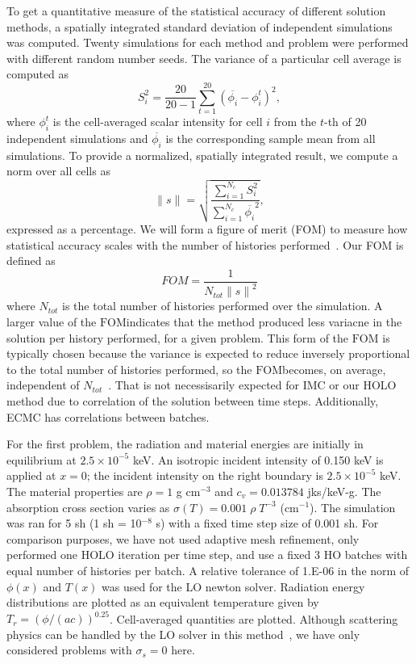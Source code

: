 \documentclass{mc2013}
\renewcommand{\ss}{\ensuremath{\|s\|}}
\newcommand{\FOM}{\ensuremath{\text{FOM}}}
\begin{document}
To get a quantitative measure of the statistical accuracy of different solution
methods, a spatially integrated standard deviation of independent simulations was
computed. Twenty simulations for each method and problem were performed with different
random number seeds.  The variance of a particular cell average is
computed as 
\begin{equation} 
    S_i^2 =  \frac{20}{20-1} \sum_{t=1}^{20} \left(\overline{\phi_{i}} -
    \phi_{i}^t\right)^2,
\end{equation}
where $\phi_{i}^t$ is the cell-averaged scalar intensity for cell $i$ from the $t$-th of 20 independent simulations and
$\overline{\phi_{i}}$ is the corresponding sample mean from all simulations. To
provide a normalized, spatially integrated result, we compute a norm over all cells as 
\begin{equation}
    \ss = \sqrt{\frac{\sum\limits_{i=1}^{N_c} S_i^2}{\sum\limits_{i=1}^{N_c}\overline{\phi_{i}}^2}},
\end{equation}
expressed as a percentage.
We will form a figure of merit (FOM) to measure how statistical accuracy
scales with the number of histories performed~\cite{wolters}.  Our FOM is defined as
\begin{equation}
    FOM = \frac{1}{N_{tot}\ss^2}
\end{equation}
where $N_{tot}$ is the total number of histories performed over the simulation.
A larger value of the \FOM indicates that the method produced less variacne in the
solution per history performed, for a given problem.  This form of the \FOM
is typically chosen because the variance is expected to reduce inversely proportional to the
total number of histories performed, so the \FOM becomes, on average, independent of
$N_{tot}$~\cite{shultis_mc}.  That is not necessisarily expected for IMC or
our HOLO method due to correlation of the solution between time steps.  Additionally, ECMC
has correlations between batches.


For the first problem, the radiation and material energies are initially in
equilibrium at $2.5\times 10^{-5}$ keV.   An isotropic incident intensity of 0.150 keV is applied
at $x=0$; the incident intensity on the right boundary is $2.5\times10^{-5}$ keV.
The material properties are $\rho = 1$ g cm$^{-3}$ and $c_v = 0.013784$ jks/keV-g. The
absorption cross section varies as $\sigma(T) = 0.001\;\rho\; T^{-3}$ (cm$^{-1}$). The simulation was ran for 5 sh (1 sh =
10$^{-8}$ s) with a fixed time step size of 0.001 sh. For comparison purposes, we
have not used adaptive mesh
refinement, only performed one HOLO iteration per time
step, and use a fixed 3 HO batches with equal number of histories per batch. A relative tolerance of 1.E-06 in the
norm of $\phi(x)$ and $T(x)$ was used for the LO newton solver. Radiation energy
distributions are plotted as an equivalent temperature given by
$T_r=(\phi/(ac))^{0.25}$.  Cell-averaged quantities are plotted.
Although scattering physics
can be handled by the LO solver in this method~\cite{ans_2014}, we have only
considered problems with $\sigma_s = 0$ here.  
\end{document}
